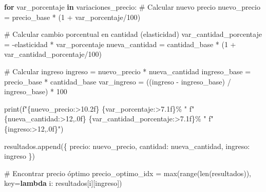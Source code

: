 \documentclass[
  doc,
  floatsintext,
  longtable,
  a4paper,
  nolmodern,
  notxfonts,
  notimes,
  12pt,
  colorlinks=true,linkcolor=blue,citecolor=blue,urlcolor=blue]{apa7}
\newenvironment{Shaded}{\begin{snugshade}}{\end{snugshade}}
\newcommand{\BuiltInTok}[1]{\textcolor[rgb]{0.00,0.23,0.31}{#1}}
\newcommand{\CommentTok}[1]{\textcolor[rgb]{0.37,0.37,0.37}{#1}}
\newcommand{\ControlFlowTok}[1]{\textcolor[rgb]{0.00,0.23,0.31}{\textbf{#1}}}
\newcommand{\DecValTok}[1]{\textcolor[rgb]{0.68,0.00,0.00}{#1}}
\newcommand{\KeywordTok}[1]{\textcolor[rgb]{0.00,0.23,0.31}{\textbf{#1}}}
\newcommand{\NormalTok}[1]{\textcolor[rgb]{0.00,0.23,0.31}{#1}}
\newcommand{\OperatorTok}[1]{\textcolor[rgb]{0.37,0.37,0.37}{#1}}
\newcommand{\SpecialCharTok}[1]{\textcolor[rgb]{0.37,0.37,0.37}{#1}}
\newcommand{\SpecialStringTok}[1]{\textcolor[rgb]{0.13,0.47,0.30}{#1}}
\newcommand{\StringTok}[1]{\textcolor[rgb]{0.13,0.47,0.30}{#1}}
\begin{document}
\begin{Shaded}
\begin{Highlighting}[]
    \ControlFlowTok{for}\NormalTok{ var\_porcentaje }\KeywordTok{in}\NormalTok{ variaciones\_precio:}
        \CommentTok{\# Calcular nuevo precio}
\NormalTok{        nuevo\_precio }\OperatorTok{=}\NormalTok{ precio\_base }\OperatorTok{*}\NormalTok{ (}\DecValTok{1} \OperatorTok{+}\NormalTok{ var\_porcentaje}\OperatorTok{/}\DecValTok{100}\NormalTok{)}
        
        \CommentTok{\# Calcular cambio porcentual en cantidad (elasticidad)}
\NormalTok{        var\_cantidad\_porcentaje }\OperatorTok{=} \OperatorTok{{-}}\NormalTok{elasticidad }\OperatorTok{*}\NormalTok{ var\_porcentaje}
\NormalTok{        nueva\_cantidad }\OperatorTok{=}\NormalTok{ cantidad\_base }\OperatorTok{*}\NormalTok{ (}\DecValTok{1} \OperatorTok{+}\NormalTok{ var\_cantidad\_porcentaje}\OperatorTok{/}\DecValTok{100}\NormalTok{)}
        
        \CommentTok{\# Calcular ingreso}
\NormalTok{        ingreso }\OperatorTok{=}\NormalTok{ nuevo\_precio }\OperatorTok{*}\NormalTok{ nueva\_cantidad}
\NormalTok{        ingreso\_base }\OperatorTok{=}\NormalTok{ precio\_base }\OperatorTok{*}\NormalTok{ cantidad\_base}
\NormalTok{        var\_ingreso }\OperatorTok{=}\NormalTok{ ((ingreso }\OperatorTok{{-}}\NormalTok{ ingreso\_base) }\OperatorTok{/}\NormalTok{ ingreso\_base) }\OperatorTok{*} \DecValTok{100}
        
        \BuiltInTok{print}\NormalTok{(}\SpecialStringTok{f"}\SpecialCharTok{\{}\NormalTok{nuevo\_precio}\SpecialCharTok{:\textgreater{}10.2f\}}\SpecialStringTok{ }\SpecialCharTok{\{}\NormalTok{var\_porcentaje}\SpecialCharTok{:\textgreater{}7.1f\}}\SpecialStringTok{\% "}
              \SpecialStringTok{f"}\SpecialCharTok{\{}\NormalTok{nueva\_cantidad}\SpecialCharTok{:\textgreater{}12,.0f\}}\SpecialStringTok{ }\SpecialCharTok{\{}\NormalTok{var\_cantidad\_porcentaje}\SpecialCharTok{:\textgreater{}7.1f\}}\SpecialStringTok{\% "}
              \SpecialStringTok{f"}\SpecialCharTok{\{}\NormalTok{ingreso}\SpecialCharTok{:\textgreater{}12,.0f\}}\SpecialStringTok{"}\NormalTok{)}
        
\NormalTok{        resultados.append(\{}
            \StringTok{\textquotesingle{}precio\textquotesingle{}}\NormalTok{: nuevo\_precio,}
            \StringTok{\textquotesingle{}cantidad\textquotesingle{}}\NormalTok{: nueva\_cantidad,}
            \StringTok{\textquotesingle{}ingreso\textquotesingle{}}\NormalTok{: ingreso}
\NormalTok{        \})}
    
    \CommentTok{\# Encontrar precio óptimo}
\NormalTok{    precio\_optimo\_idx }\OperatorTok{=} \BuiltInTok{max}\NormalTok{(}\BuiltInTok{range}\NormalTok{(}\BuiltInTok{len}\NormalTok{(resultados)), }
\NormalTok{                            key}\OperatorTok{=}\KeywordTok{lambda}\NormalTok{ i: resultados[i][}\StringTok{\textquotesingle{}ingreso\textquotesingle{}}\NormalTok{])}
    

\end{Highlighting}
\end{Shaded}
\end{document}
